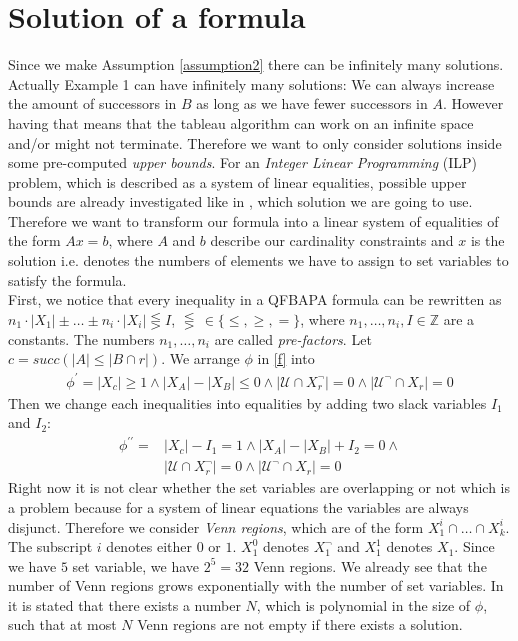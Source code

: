 \documentclass{book}
\theoremstyle{break}
\theoremstyle{definition}
\begin{document}
\section{Solution of a formula}
Since we make Assumption \ref{assumption2} there can be infinitely many solutions. Actually Example 1 can have infinitely many solutions: We can always increase the amount of successors in $B$ as long as we have fewer successors in $A$. However having that means that the tableau algorithm can work on an infinite space and/or might not terminate. Therefore we want to only consider solutions inside some pre-computed \textit{upper bounds}. For an \textit{Integer Linear Programming} (ILP) problem, which is described as a system of linear equalities, possible upper bounds are already investigated like in \cite{knapsack}, which solution we are going to use. Therefore we want to transform our formula into a linear system of equalities of the form $Ax=b$, where $A$ and $b$ describe our cardinality constraints and $x$ is the solution i.e. denotes the numbers of elements we have to assign to set variables to satisfy the formula. \\
First, we notice that every inequality in a QFBAPA formula can be
rewritten as $n_1\cdot|X_1|\pm \dots \pm n_i\cdot|X_i|\lesseqgtr I$, $\lesseqgtr\,\in\{\leq,\geq,=\}$, where $n_1,\dots, n_i,I\in\mathbb{Z}$ are a constants. The numbers $n_1,\dots,n_i$ are called \textit{pre-factors}. Let $c={succ(|A|\leq |B\cap r|)}$. We arrange $\phi$ in \eqref{f} into
\begin{align}
\phi^\prime=|X_{c}|\geq 1\wedge |X_A|- |X_B|\leq 0 \wedge |\mathcal{U}\cap X_r^\neg|=0\wedge |\mathcal{U}^\neg\cap X_r|=0
\end{align} 
Then we change each inequalities into equalities by adding two slack variables $I_1$ and $I_2$:
\begin{align}
\phi^{\prime\prime}=&|X_{c}|- I_1= 1\wedge |X_A|-|X_B|+I_2= 0 \wedge \nonumber\\
&|\mathcal{U}\cap X_r^\neg|=0\wedge |\mathcal{U}^\neg\cap X_r|=0
\end{align}
Right now it is not clear whether the set variables are overlapping or not which is a problem because for a system of linear equations the variables are always disjunct. Therefore we consider \textit{Venn regions}, which are of the form $X^i_1\cap \dots \cap X^i_k$. The subscript $i$ denotes either $0$ or $1$. $X^0_1$ denotes $X^\neg_1$ and $X^1_1$ denotes $X_1$. Since we have $5$ set variable, we have $2^5=32$ Venn regions. We already see that the number of Venn regions grows exponentially with the number of set variables. In \cite{4} it is stated that there exists a number $N$, which is polynomial in the size of $\phi$, such that at most $N$ Venn regions are not empty if there exists a solution.
\end{document}
